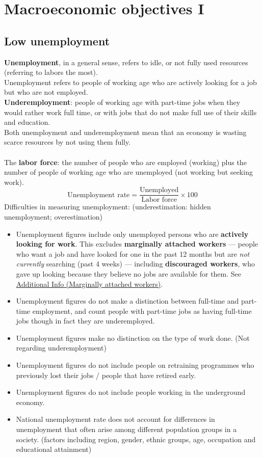 \documentclass[a4paper,12pt]{article}
\newcommand{\needbold}[1]{\textcolor{red!70!black}{\textbf{#1}}}
\begin{document}
\section{Macroeconomic objectives I}\label{sec:macro-obj-1}
\subsection{Low unemployment}
\needbold{Unemployment}, in a general sense, refers to idle, or not fully used resources (referring to labors the most). \\
Unemployment refers to people of working age who are actively looking for a job but who are not employed.\\
\needbold{Underemployment}: people of working age with part-time jobs when they would rather work full time, or with jobs that do not make full use of their skills and education. \\
Both unemployment and underemployment mean that an economy is wasting scarce resources by not using them fully.\\\\
The \needbold{labor force}: the number of people who are employed (working) plus the number of people of working age who are unemployed (not working but seeking work).
\[\text{Unemployment rate}=\dfrac{\text{Unemployed}}{\text{Labor force}}\times 100\]
Difficulties in measuring unemployment: (underestimation: hidden unemployment; overestimation)
\begin{itemize}
  \item Unemployment figures include only unemployed persons who are \textbf{actively looking for work}. This excludes \textbf{marginally attached workers} --- people who want a job and have looked for one in the past 12 months but are \textit{not currently} searching (past 4 weeks) --- including \textbf{discouraged workers}, who gave up looking because they believe no jobs are available for them. See \hyperref[sec:add-marginal]{Additional Info (Marginally attached workers)}.
  \item Unemployment figures do not make a distinction between full-time and part-time employment, and count people with part-time jobs as having full-time jobs though in fact they are underemployed.
  \item Unemployment figures make no distinction on the type of work done. (Not regarding underemployment)
  \item Unemployment figures do not include people on retraining programmes who previously lost their jobs / people that have retired early.
  \item Unemployment figures do not include people working in the underground economy.
  \item National unemployment rate does not account for differences in unemployment that often arise among different population groups in a society. (factors including region, gender, ethnic groups, age, occupation and educational attainment)
\end{itemize}
\end{document}
